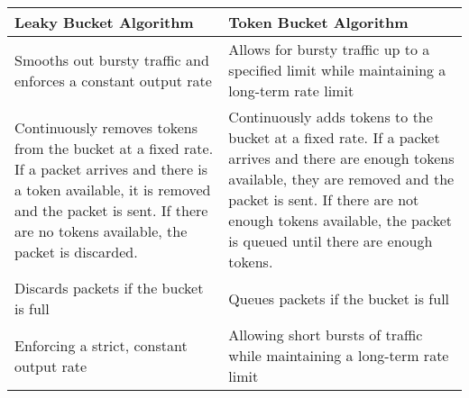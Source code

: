 \documentclass{korigamik}
\begin{document}
\begin{table}[!ht]
	\centering
	\begin{tabular}{p{2.8in}|p{2.8in}}

		\textbf{Leaky Bucket Algorithm}                                                                                                                                                                                   & \textbf{Token Bucket Algorithm}                                                                                                                                                                                                                          \rule[-1.2ex]{0pt}{0pt} \\ \hline

		Smooths out bursty traffic and enforces a constant output rate                                                                                                                                                    & Allows for bursty traffic up to a specified limit while maintaining a long-term rate limit                                                                                                                                                                                       \\
		Continuously removes tokens from the bucket at a fixed rate. If a packet arrives and there is a token available, it is removed and the packet is sent. If there are no tokens available, the packet is discarded. & Continuously adds tokens to the bucket at a fixed rate. If a packet arrives and there are enough tokens available, they are removed and the packet is sent. If there are not enough tokens available, the packet is queued until there are enough tokens.                        \\
		Discards packets if the bucket is full                                                                                                                                                                            & Queues packets if the bucket is full                                                                                                                                                                                                                                             \\
		Enforcing a strict, constant output rate                                                                                                                                                                          & Allowing short bursts of traffic while maintaining a long-term rate limit                                                                                                                                                                                                        \\

\end{tabular}
\end{table}
\end{document}
